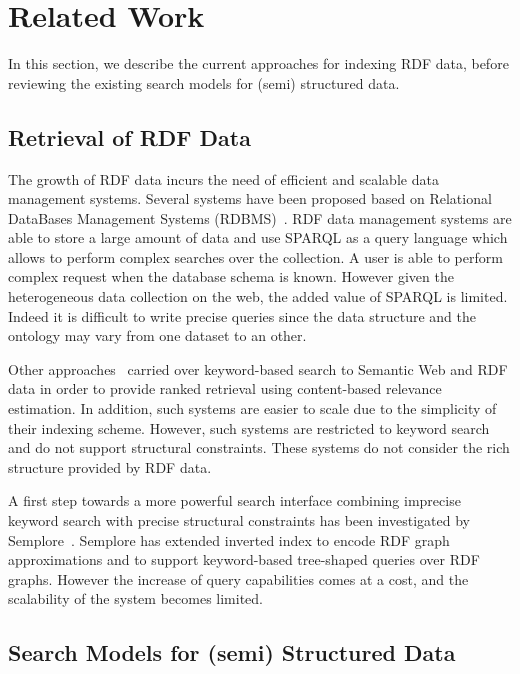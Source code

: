 \section{Related Work}

In this section, we describe the current approaches for indexing RDF data,
before reviewing the existing search models for (semi) structured data.

\subsection{Retrieval of RDF Data}

The growth of RDF data incurs the need of efficient and scalable data
management systems. Several systems have been proposed based on Relational
DataBases Management Systems (RDBMS)~\cite{beckett:2003:swss-rdbms}. RDF data
management systems are able to store a large amount of data and use SPARQL as a
query language which allows to perform complex searches over the collection. A
user is able to perform complex request when the database schema is known.
However given the heterogeneous data collection on the web, the added value of
SPARQL is limited. Indeed it is difficult to write precise queries since the
data structure and the ontology may vary from one dataset to an other.

Other
approaches~\cite{guha:2003:tap,ding:2005:swoogle,harth:2008:swse,cheng:2008:falcons}
carried over keyword-based search to Semantic Web and RDF data in order to
provide ranked retrieval using content-based relevance estimation. In
addition, such systems are easier to scale due to the simplicity of their
indexing scheme. However, such systems are restricted to keyword search and do
not support structural constraints. These systems do not consider the rich
structure provided by RDF data.

A first step towards a more powerful search
interface combining imprecise keyword search with precise structural
constraints has been investigated by Semplore~\cite{wang:2009:semplore}.
Semplore has extended inverted index to encode RDF
graph approximations and to support keyword-based tree-shaped queries over RDF
graphs. However the increase of query capabilities comes at a cost, and the
scalability of the system becomes limited.

\subsection{Search Models for (semi) Structured Data}

